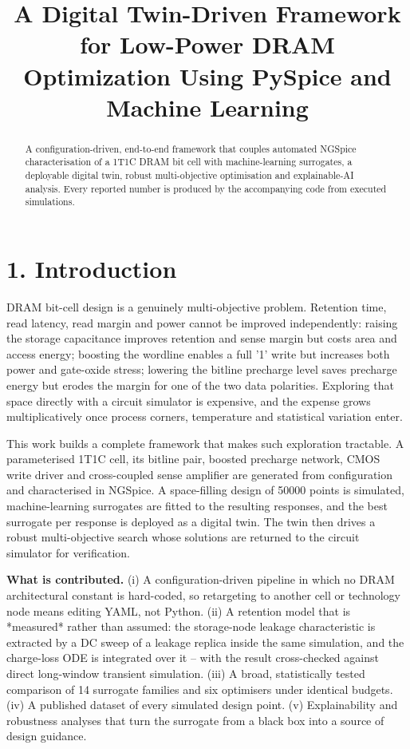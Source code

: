 \documentclass[conference]{IEEEtran}
\begin{document}
\title{A Digital Twin-Driven Framework for Low-Power DRAM Optimization Using PySpice and Machine Learning}
\maketitle

\begin{abstract}
A configuration-driven, end-to-end framework that couples automated NGSpice characterisation of a 1T1C DRAM bit cell with machine-learning surrogates, a deployable digital twin, robust multi-objective optimisation and explainable-AI analysis. Every reported number is produced by the accompanying code from executed simulations.
\end{abstract}

\section{1. Introduction}
DRAM bit-cell design is a genuinely multi-objective problem. Retention time,
read latency, read margin and power cannot be improved independently: raising the
storage capacitance improves retention and sense margin but costs area and access
energy; boosting the wordline enables a full '1' write but increases both power and
gate-oxide stress; lowering the bitline precharge level saves precharge energy but
erodes the margin for one of the two data polarities. Exploring that space directly
with a circuit simulator is expensive, and the expense grows multiplicatively once
process corners, temperature and statistical variation enter.

This work builds a complete framework that makes such exploration tractable. A
parameterised 1T1C cell, its bitline pair, boosted precharge network, CMOS write
driver and cross-coupled sense amplifier are generated from configuration and
characterised in NGSpice. A space-filling design of
50000 points is
simulated, machine-learning surrogates are fitted to the resulting responses, and the
best surrogate per response is deployed as a digital twin. The twin then drives a
robust multi-objective search whose solutions are returned to the circuit simulator
for verification.

\textbf{What is contributed.} (i) A configuration-driven pipeline in which no DRAM
architectural constant is hard-coded, so retargeting to another cell or technology
node means editing YAML, not Python. (ii) A retention model that is *measured*
rather than assumed: the storage-node leakage characteristic is extracted by a DC
sweep of a leakage replica inside the same simulation, and the charge-loss ODE is
integrated over it -- with the result cross-checked against direct long-window
transient simulation. (iii) A broad, statistically tested comparison of
14 surrogate
families and six optimisers under identical budgets. (iv) A published dataset of
every simulated design point. (v) Explainability and robustness analyses that turn
the surrogate from a black box into a source of design guidance.
\end{document}
